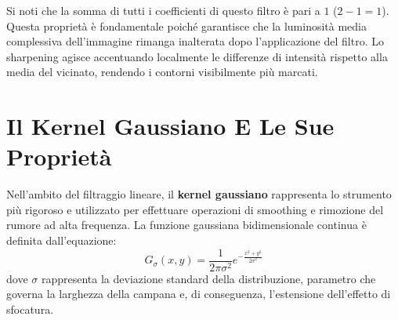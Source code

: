﻿\documentclass[11pt, a4paper]{article}
\begin{document}
Si noti che la somma di tutti i coefficienti di questo filtro è pari a $1$ ($2 - 1 = 1$). Questa proprietà è fondamentale poiché garantisce che la luminosità media complessiva dell'immagine rimanga inalterata dopo l'applicazione del filtro. Lo sharpening agisce accentuando localmente le differenze di intensità rispetto alla media del vicinato, rendendo i contorni visibilmente più marcati.



\newpage

\section{Il Kernel Gaussiano E Le Sue Proprietà}

Nell'ambito del filtraggio lineare, il \textbf{kernel gaussiano} rappresenta lo strumento più rigoroso e utilizzato per effettuare operazioni di smoothing e rimozione del rumore ad alta frequenza. La funzione gaussiana bidimensionale continua è definita dall'equazione:
\[ \boxed{G_{\sigma}(x, y) = \frac{1}{2\pi\sigma^2} e^{-\frac{x^2 + y^2}{2\sigma^2}}} \]
dove $\sigma$ rappresenta la deviazione standard della distribuzione, parametro che governa la larghezza della campana e, di conseguenza, l'estensione dell'effetto di sfocatura.

\end{document}
